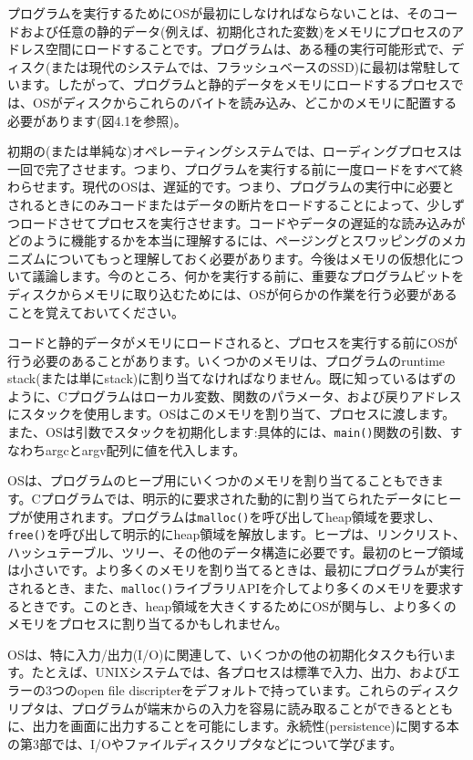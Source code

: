 プログラムを実行するためにOSが最初にしなければならないことは、そのコードおよび任意の静的データ(例えば、初期化された変数)をメモリにプロセスのアドレス空間にロードすることです。プログラムは、ある種の実行可能形式で、ディスク(または現代のシステムでは、フラッシュベースのSSD)に最初は常駐しています。したがって、プログラムと静的データをメモリにロードするプロセスでは、OSがディスクからこれらのバイトを読み込み、どこかのメモリに配置する必要があります(図4.1を参照)。

初期の(または単純な)オペレーティングシステムでは、ローディングプロセスは一回で完了させます。つまり、プログラムを実行する前に一度ロードをすべて終わらせます。現代のOSは、遅延的です。つまり、プログラムの実行中に必要とされるときにのみコードまたはデータの断片をロードすることによって、少しずつロードさせてプロセスを実行させます。コードやデータの遅延的な読み込みがどのように機能するかを本当に理解するには、ページングとスワッピングのメカニズムについてもっと理解しておく必要があります。今後はメモリの仮想化について議論します。今のところ、何かを実行する前に、重要なプログラムビットをディスクからメモリに取り込むためには、OSが何らかの作業を行う必要があることを覚えておいてください。

コードと静的データがメモリにロードされると、プロセスを実行する前にOSが行う必要のあることがあります。いくつかのメモリは、プログラムのruntime
stack(または単にstack)に割り当てなければなりません。既に知っているはずのように、Cプログラムはローカル変数、関数のパラメータ、および戻りアドレスにスタックを使用します。OSはこのメモリを割り当て、プロセスに渡します。また、OSは引数でスタックを初期化します:具体的には、\texttt{main()}関数の引数、すなわちargcとargv配列に値を代入します。

OSは、プログラムのヒープ用にいくつかのメモリを割り当てることもできます。Cプログラムでは、明示的に要求された動的に割り当てられたデータにヒープが使用されます。プログラムは\texttt{malloc()}を呼び出してheap領域を要求し、\texttt{free()}を呼び出して明示的にheap領域を解放します。ヒープは、リンクリスト、ハッシュテーブル、ツリー、その他のデータ構造に必要です。最初のヒープ領域は小さいです。より多くのメモリを割り当てるときは、最初にプログラムが実行されるとき、また、\texttt{malloc()}ライブラリAPIを介してより多くのメモリを要求するときです。このとき、heap領域を大きくするためにOSが関与し、より多くのメモリをプロセスに割り当てるかもしれません。

OSは、特に入力/出力(I/O)に関連して、いくつかの他の初期化タスクも行います。たとえば、UNIXシステムでは、各プロセスは標準で入力、出力、およびエラーの3つのopen
file
discripterをデフォルトで持っています。これらのディスクリプタは、プログラムが端末からの入力を容易に読み取ることができるとともに、出力を画面に出力することを可能にします。永続性(persistence)に関する本の第3部では、I/Oやファイルディスクリプタなどについて学びます。


